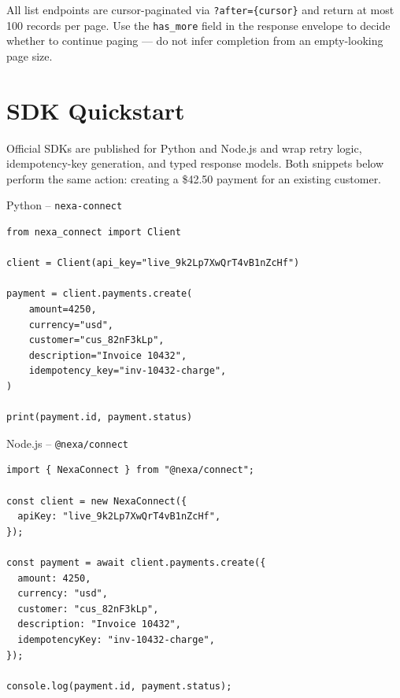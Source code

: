 \documentclass[10pt]{article}
\begin{document}
\vspace{1mm}
\begin{infobox}
All list endpoints are cursor-paginated via \texttt{?after=\{cursor\}} and return at most
100 records per page. Use the \texttt{has\_more} field in the response envelope to decide
whether to continue paging --- do not infer completion from an empty-looking page size.
\end{infobox}

\section{SDK Quickstart}

Official SDKs are published for Python and Node.js and wrap retry logic, idempotency-key
generation, and typed response models. Both snippets below perform the same action:
creating a \$42.50 payment for an existing customer.

\begin{minipage}[t]{0.485\textwidth}
\begin{codepanel}{Python -- \texttt{nexa-connect}}
\begin{lstlisting}[style=nexapython]
from nexa_connect import Client

client = Client(api_key="live_9k2Lp7XwQrT4vB1nZcHf")

payment = client.payments.create(
    amount=4250,
    currency="usd",
    customer="cus_82nF3kLp",
    description="Invoice 10432",
    idempotency_key="inv-10432-charge",
)

print(payment.id, payment.status)
\end{lstlisting}
\end{codepanel}
\end{minipage}\hfill
\begin{minipage}[t]{0.485\textwidth}
\begin{codepanel}{Node.js -- \texttt{@nexa/connect}}
\begin{lstlisting}[style=nexajs]
import { NexaConnect } from "@nexa/connect";

const client = new NexaConnect({
  apiKey: "live_9k2Lp7XwQrT4vB1nZcHf",
});

const payment = await client.payments.create({
  amount: 4250,
  currency: "usd",
  customer: "cus_82nF3kLp",
  description: "Invoice 10432",
  idempotencyKey: "inv-10432-charge",
});

console.log(payment.id, payment.status);
\end{lstlisting}
\end{codepanel}
\end{minipage}
\par
\end{document}
